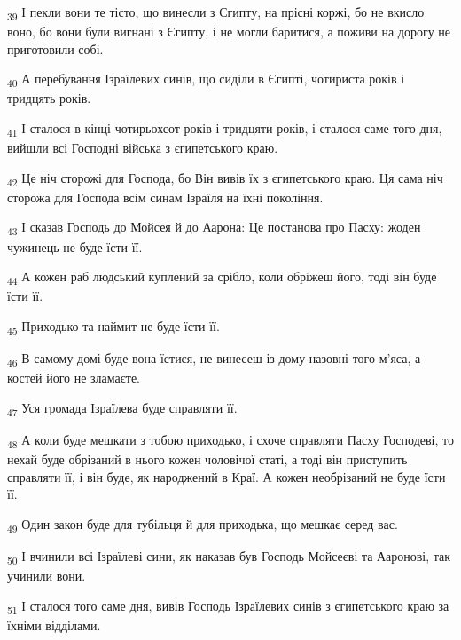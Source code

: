 \begin{tcolorbox}
\textsubscript{39} І пекли вони те тісто, що винесли з Єгипту, на прісні коржі, бо не вкисло воно, бо вони були вигнані з Єгипту, і не могли баритися, а поживи на дорогу не приготовили собі.
\end{tcolorbox}
\begin{tcolorbox}
\textsubscript{40} А перебування Ізраїлевих синів, що сиділи в Єгипті, чотириста років і тридцять років.
\end{tcolorbox}
\begin{tcolorbox}
\textsubscript{41} І сталося в кінці чотирьохсот років і тридцяти років, і сталося саме того дня, вийшли всі Господні війська з єгипетського краю.
\end{tcolorbox}
\begin{tcolorbox}
\textsubscript{42} Це ніч сторожі для Господа, бо Він вивів їх з єгипетського краю. Ця сама ніч сторожа для Господа всім синам Ізраїля на їхні покоління.
\end{tcolorbox}
\begin{tcolorbox}
\textsubscript{43} І сказав Господь до Мойсея й до Аарона: Це постанова про Пасху: жоден чужинець не буде їсти її.
\end{tcolorbox}
\begin{tcolorbox}
\textsubscript{44} А кожен раб людський куплений за срібло, коли обріжеш його, тоді він буде їсти її.
\end{tcolorbox}
\begin{tcolorbox}
\textsubscript{45} Приходько та наймит не буде їсти її.
\end{tcolorbox}
\begin{tcolorbox}
\textsubscript{46} В самому домі буде вона їстися, не винесеш із дому назовні того м'яса, а костей його не зламаєте.
\end{tcolorbox}
\begin{tcolorbox}
\textsubscript{47} Уся громада Ізраїлева буде справляти її.
\end{tcolorbox}
\begin{tcolorbox}
\textsubscript{48} А коли буде мешкати з тобою приходько, і схоче справляти Пасху Господеві, то нехай буде обрізаний в нього кожен чоловічої статі, а тоді він приступить справляти її, і він буде, як народжений в Краї. А кожен необрізаний не буде їсти її.
\end{tcolorbox}
\begin{tcolorbox}
\textsubscript{49} Один закон буде для тубільця й для приходька, що мешкає серед вас.
\end{tcolorbox}
\begin{tcolorbox}
\textsubscript{50} І вчинили всі Ізраїлеві сини, як наказав був Господь Мойсеєві та Ааронові, так учинили вони.
\end{tcolorbox}
\begin{tcolorbox}
\textsubscript{51} І сталося того саме дня, вивів Господь Ізраїлевих синів з єгипетського краю за їхніми відділами.
\end{tcolorbox}
